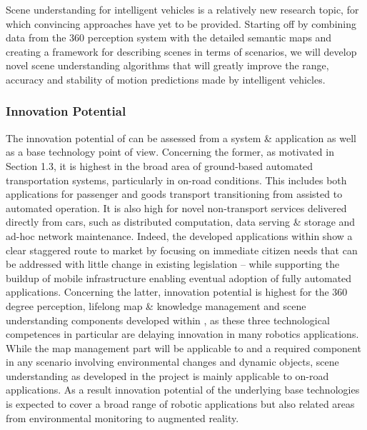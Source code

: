 
Scene understanding for intelligent vehicles is a relatively new research topic, for which convincing approaches have yet to be provided. Starting off by combining data from the 360\degree{} perception system with the detailed semantic maps and creating a framework for describing scenes in terms of scenarios, we will develop novel scene understanding algorithms that will greatly improve the range, accuracy and stability of motion predictions made by intelligent vehicles.  

\subsubsection{Innovation Potential}
The innovation potential of \Project{} can be assessed from a system \& application as well as a base technology point of view. Concerning the former, as motivated in Section 1.3, it is highest in the broad area of ground-based automated transportation systems, particularly in on-road conditions. This includes both applications for passenger and goods transport transitioning from assisted to automated operation. It is also high for novel non-transport services delivered directly from cars, such as distributed computation, data serving \& storage and ad-hoc network maintenance. Indeed, the developed applications within \Project{} show a clear staggered route to market by focusing on immediate citizen needs that can be addressed with little change in existing legislation -- while supporting the buildup of mobile infrastructure enabling eventual adoption of fully automated applications. Concerning the latter, innovation potential is highest for the 360 degree perception, lifelong map \& knowledge management and scene understanding components developed within \Project{}, as these three technological competences in particular are delaying innovation in many robotics applications. While the map management part will be applicable to and a required component in any scenario involving environmental changes and dynamic objects, scene understanding as developed in the project is mainly applicable to on-road applications. As a result innovation potential of the underlying base technologies is expected to cover a broad range of robotic applications but also related areas from environmental monitoring to augmented reality.



